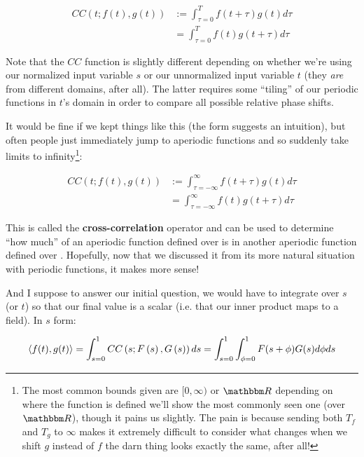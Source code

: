 \documentclass[letterpaper,12pt]{report}
\begin{document}
\[ \begin{split}
  CC(t; f(t), g(t)) &:= 
    \int_{\tau = 0}^{T} f(t + \tau) g(t) d\tau \\
    &= \int_{\tau = 0}^{T} f(t) g(t + \tau) d\tau
\end{split}
\]

Note that the \(CC\) function is slightly different depending
on whether we're using our normalized input variable \(s\) or
our unnormalized input variable \(t\) (they \emph{are}
from different domains, after all). The latter
requires some ``tiling'' of our periodic functions in
\(t\)'s domain
in order to compare all possible relative phase shifts.\par

It would be fine if we kept things like this (the form suggests
an intuition), but often people just immediately jump to
aperiodic functions and so suddenly take limits to infinity\footnote
{
  The most common bounds given are
  \([0, \infty)\) or \(\domain{R}\) depending on where
  the function is defined \textemdash{} we'll show the most
  commonly seen one (over \(\domain{R}\)), though it pains us slightly.
  The pain is because sending both \(T_f\) and \(T_g\) to \(\infty\)
  makes it extremely difficult to consider what changes when we
  shift \(g\) instead of \(f\) \textemdash{} the darn thing
  looks exactly the same, after all!
}:

\[ \begin{split}
  CC(t; f(t), g(t)) &:= 
    \int_{\tau = -\infty}^{\infty} f(t + \tau) g(t) d\tau \\
    &= \int_{\tau = -\infty}^{\infty} f(t) g(t + \tau) d\tau
\end{split}
\]

This is called the \textbf{cross-correlation}
operator
and can be used to determine ``how much'' of an aperiodic 
function defined over  is in another aperiodic function 
defined over . Hopefully, now that we discussed it
from its more natural situation with periodic functions,
it makes more sense! \par

And I suppose to answer our initial question,
we would have to integrate over \(s\) (or \(t\)) so that
our final value is a scalar (i.e. that our inner product maps
to a field). In \(s\) form:

\[ \innerprod[f(t)][g(t)] =
\int_{s=0}^{1}CC\left(s; F\left(s\right), G\left(s\right)\right) ds = 
\int_{s=0}^{1} \int_{\phi = 0}^{1} F(s + \phi) G(s) d\phi ds
\]
\end{document}
